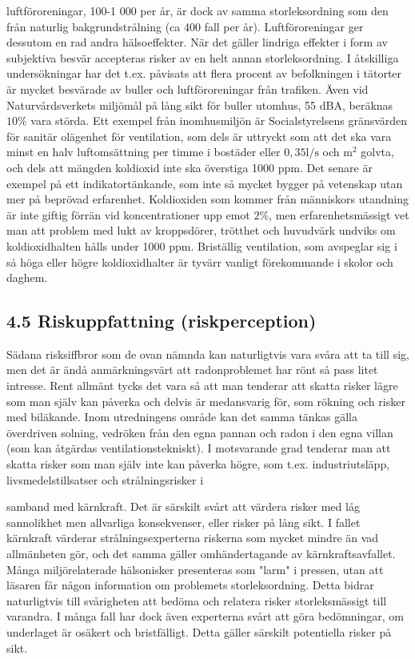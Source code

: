 luftföroreningar, 100-1 000 per år, är dock av samma storleksordning som den från naturlig bakgrundstrålning (ca 400 fall per år). Luftföroreningar ger dessutom en rad andra hälsoeffekter.
När det gäller lindriga effekter i form av subjektiva besvär accepteras risker av en helt annan storleksordning. I åtskilliga undersökningar har det t.ex. påvisats att flera procent av befolkningen i tätorter är mycket besvärade av buller och luftföroreningar från trafiken. Även vid Naturvårdsverkets miljömål på lång sikt för buller utomhus, 55 dBA, beräknas \(10 \%\) vara störda.
Ett exempel från inomhusmiljön är Socialstyrelsens gränsvärden för sanitär olägenhet för ventilation, som dels är uttryckt som att det ska vara minst en halv luftomsättning per timme i bostäder eller \(0,35 \mathrm{l} / \mathrm{s}\) och \(\mathrm{m}^{2}\) golvta, och dels att mängden koldioxid inte ska överstiga 1000 ppm. Det senare är exempel på ett indikatortänkande, som inte så mycket bygger på vetenskap utan mer på beprövad erfarenhet. Koldioxiden som kommer från människors utandning är inte giftig förrän vid koncentrationer upp emot \(2 \%\), men erfarenhetsmässigt vet man att problem med lukt av kroppsdörer, trötthet och huvudvärk undviks om koldioxidhalten hålls under 1000 ppm. Briställig ventilation, som avspeglar sig i så höga eller högre koldioxidhalter är tyvärr vanligt förekommande i skolor och daghem.
\subsection*{4.5 Riskuppfattning (riskperception)}
Sädana risksiffbror som de ovan nämnda kan naturligtvis vara svåra att ta till sig, men det är ändå anmärkningsvärt att radonproblemet har rönt så pass litet intresse. Rent allmänt tycks det vara så att man tenderar att skatta risker lägre som man själv kan påverka och delvis är medansvarig för, som rökning och risker med biläkande. Inom utredningens område kan det samma tänkas gälla överdriven solning, vedröken från den egna pannan och radon i den egna villan (som kan åtgärdas ventilationstekniskt). I motsvarande grad tenderar man att skatta risker som man själv inte kan påverka högre, som t.ex. industriutsläpp, livsmedelstillsatser och strålningsrisker i

samband med kärnkraft. Det är särskilt svårt att värdera risker med låg sannolikhet men allvarliga konsekvenser, eller risker på lång sikt. I fallet kärnkraft värderar strålningsexperterna riskerna som mycket mindre än vad allmänheten gör, och det samma gäller omhändertagande av kärnkraftsavfallet.
Många miljörelaterade hälsonisker presenteras som "larm" i pressen, utan att läsaren får någon information om problemets storleksordning. Detta bidrar naturligtvis till svårigheten att bedöma och relatera risker storleksmässigt till varandra. I många fall har dock även experterna svårt att göra bedömningar, om underlaget är osäkert och bristfälligt. Detta gäller särskilt potentiella risker på sikt.
